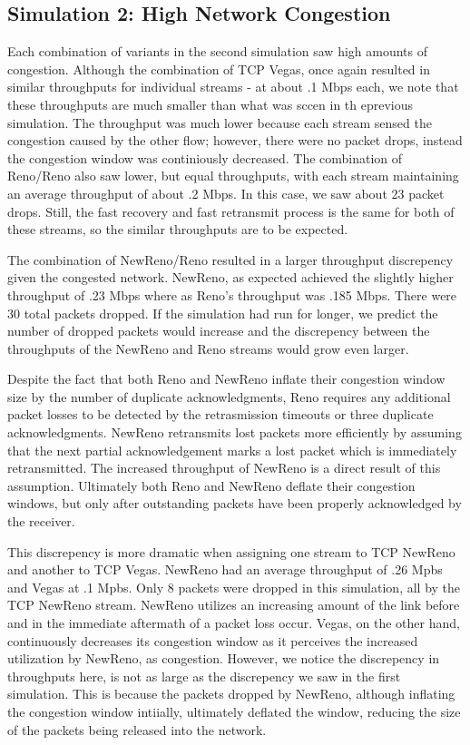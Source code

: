 \subsection{Simulation 2: High Network Congestion}

Each combination of variants in the second simulation saw high amounts of congestion. Although the combination of TCP Vegas, once again resulted in similar throughputs for individual streams - at about .1 Mbps each, we note that these throughputs are much smaller than what was sccen in th eprevious simulation. The throughput was much lower because each stream sensed the congestion caused by the other flow; however, there were no packet drops, instead the congestion window was continiously decreased. The combination of Reno/Reno also saw lower, but equal throughputs, with each stream maintaining an average throughput of about .2 Mbps. In this case, we saw about 23 packet drops. Still, the fast recovery and fast retransmit process is the same for both of these streams, so the similar throughputs are to be expected.

The combination of NewReno/Reno resulted in a larger throughput discrepency given the congested network. NewReno, as expected achieved the slightly higher throughput of .23 Mbps where as Reno's throughput was .185 Mbps. There were 30 total packets dropped. If the simulation had run for longer, we predict the number of dropped packets would increase and the discrepency between the throughputs of the NewReno and Reno streams would grow even larger.

Despite the fact that both Reno and NewReno inflate their congestion window size by the number of duplicate acknowledgments, Reno requires any additional packet losses to be detected by the retrasmission timeouts or three duplicate acknowledgments. NewReno retransmits lost packets more efficiently by assuming that the next partial acknowledgement marks a lost packet which is immediately retransmitted. The increased throughput of NewReno is a direct result of this assumption. Ultimately both Reno and NewReno deflate their congestion windows, but only after outstanding packets have been properly acknowledged by the receiver.

This discrepency is more dramatic when assigning one stream to TCP NewReno and another to TCP Vegas. NewReno had an average throughput of .26 Mpbs and Vegas at .1 Mpbs. Only 8 packets were dropped in this simulation, all by the TCP NewReno stream. NewReno utilizes an increasing amount of the link before and in the immediate aftermath of a packet loss occur. Vegas, on the other hand, continuously decreases its congestion window as it perceives the increased utilization by NewReno, as congestion. However, we notice the discrepency in throughputs here, is not as large as the discrepency we saw in the first simulation. This is because the packets dropped by NewReno, although inflating the congestion window intiially, ultimately deflated the window, reducing the size of the packets being released into the network.




